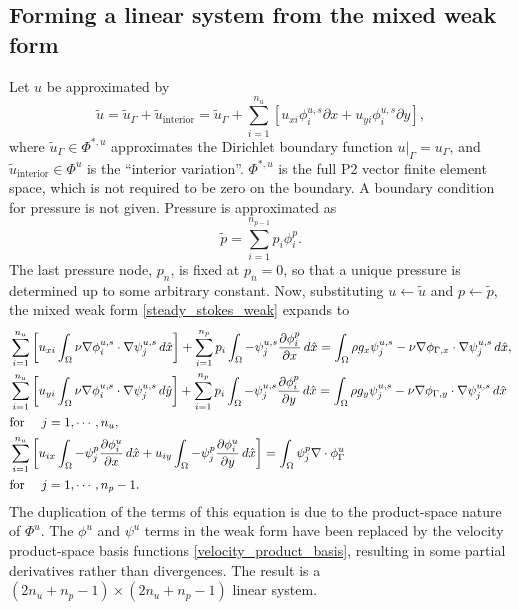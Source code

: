 \subsection{Forming a linear system from the mixed weak form}
Let $u$ be approximated by
$$\tilde{u} = \tilde{u}_\Gamma + \tilde{u}_\text{interior} = \tilde{u}_\Gamma +
    \sum_{i=1}^{n_u}\left[
    u_{xi}\phi^{u,s}_i\partial x
    +
    u_{yi}\phi^{u,s}_i\partial y\right],
$$
where $\tilde{u}_\Gamma \in \Phi^{*,u}$ approximates the Dirichlet boundary function $\left.u\right|_\Gamma = u_\Gamma$,
and $\tilde{u}_{\text{interior}} \in \Phi^u$ is the ``interior variation''.
$\Phi^{*,u}$ is the full P2 vector finite element space, which is not required to be zero on the boundary.
A boundary condition for pressure is not given. Pressure is approximated as
    $$\tilde{p} = \sum_{i=1}^{n_{p-1}} p_i\phi^p_i.$$
The last pressure node, $p_n$, is fixed at $p_n = 0$, so that a unique pressure is determined up to some arbitrary constant.
Now, substituting $u \leftarrow \tilde{u}$ and $p \leftarrow \tilde{p}$, the mixed weak form \eqref{steady_stokes_weak} expands to
\begin{equation}\label{steady_stokes_linear_system}
\begin{split}
&\sum_{i=1}^{n_u} \left[u_{xi}\int_\Omega \nu\nabla\phi^{u,s}_i \cdot \nabla\psi^{u,s}_j\,d\hat{x}\right]
        + \sum_{i=1}^{n_p} p_i\int_\Omega -\psi^{u,s}_j \frac{\partial \phi^p_{i}}{\partial x}\,d\hat{x}
    = \int_\Omega \rho g_x \psi^{u,s}_j
        - \nu\nabla\phi_{\Gamma,x} \cdot \nabla\psi^{u,s}_j \,d\hat{x},\\
    &\sum_{i=1}^{n_u} \left[u_{yi}\int_\Omega \nu\nabla\phi^{u,s}_i \cdot \nabla\psi^{u,s}_j\,d\hat{y}\right]
            + \sum_{i=1}^{n_p} p_i\int_{\Omega} -\psi^{u,s}_j \frac{\partial \phi^p_{i}}{\partial y}\,d\hat{x}
        = \int_\Omega \rho g_y \psi^{u,s}_j
            - \nu\nabla\phi_{\Gamma,y} \cdot \nabla\psi^{u,s}_j \,d\hat{x}\\
    &\text{for \quad} j=1,\cdots,n_u,\\
    &\sum_{i=1}^{n_u} \left[u_{ix} \int_\Omega -\psi^p_j \frac{\partial \phi^u_i}{\partial x} \,d\hat{x}
    + u_{iy} \int_\Omega -\psi^p_j \frac{\partial \phi^u_i}{\partial y} \,d\hat{x}\right]
        = \int_\Omega \psi^p_j \nabla \cdot \phi^u_\Gamma\\
    &\text{for \quad} j=1,\cdots,n_p-1.\\
\end{split}
\end{equation}
The duplication of the terms of this equation is due to the product-space nature of $\Phi^u$. The $\phi^u$ and $\psi^u$ terms
in the weak form have been replaced by the velocity product-space basis functions \eqref{velocity_product_basis}, resulting
in some partial derivatives rather than divergences. The result is a $(2n_u + n_p - 1)\times (2n_u + n_p - 1)$ linear system.


